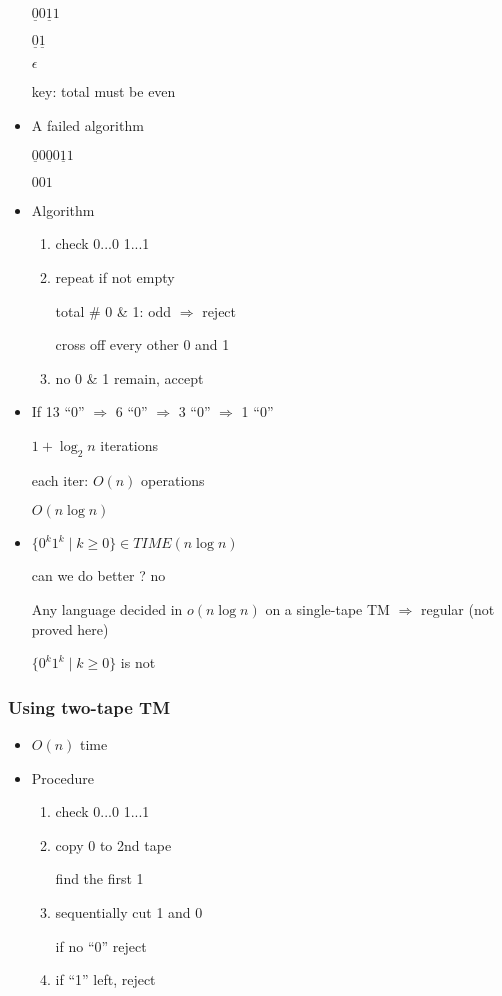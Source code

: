 \begin{frame}[allowframebreaks]
\begin{itemize}
$\underline{0}0
\underline{1}1
$

$\underline{0}
\underline{1}
$

$\epsilon$

key: total must be even

\item A failed algorithm


$\underline{0}0
\underline{0}0
\underline{1}1
$

$001
$

\item 
Algorithm
\begin{enumerate}
\item check 0...0 1...1
\item repeat if not empty 

total \# 0 \& 1: odd $\Rightarrow$ reject

cross off every other 0 and 1
\item no 0 \& 1 remain, accept
\end{enumerate}
\item If  13 ``0'' $\Rightarrow$
6 ``0'' $\Rightarrow$
3 ``0'' $\Rightarrow$
1 ``0'' 

$1+\log_2 n$ iterations

each iter: $O(n)$ operations

$O(n \log n)$

\item $\{0^k 1^k\mid k \geq 0\} \in TIME(n \log n)$

can we do better ? no

Any language decided in $o(n\log n)$
on a single-tape TM $\Rightarrow$ regular
(not proved here)

$\{0^k1^k \mid k \geq 0\}$ is not

\end{itemize}\end{frame} \begin{frame}[allowframebreaks] \frametitle{Using two-tape TM}
  \begin{itemize}
\item $O(n)$  time
\item Procedure 
  \begin{enumerate}
  \item check 0...0 1...1

  \item copy 0 to 2nd tape

find the first 1
\item sequentially cut 1 and 0

if no ``0'' reject
\item if ``1'' left, reject


\end{enumerate}
\end{itemize}
\end{frame}
